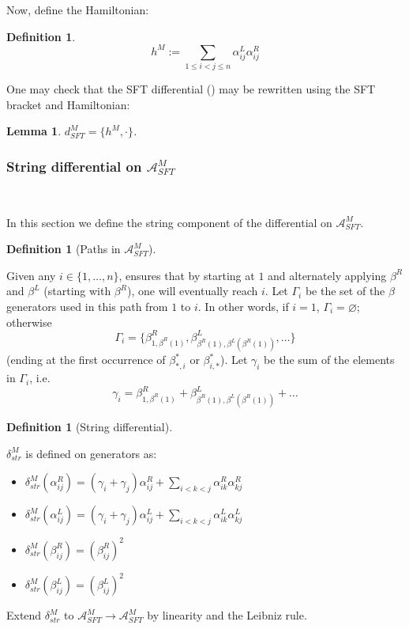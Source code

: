 \documentclass[a4paper,final, reqno]{amsart}
\theoremstyle{plain}
\newtheorem{Lemma}[Th]{Lemma}
\theoremstyle{definition}
\newtheorem{Def}[Th]{Definition}
\newcommand{\A}{\mathcal{A}}
\begin{document}
	Now, define the Hamiltonian:
	
	\begin{Def}
		\[ h^M := \sum_{1\leq i<j\leq n} \alpha_{ij}^L\alpha_{ij}^R \]
	\end{Def}
	
	One may check that the SFT differential () may be rewritten using the SFT bracket and Hamiltonian:
	
	
	\begin{Lemma}
		$d_{SFT}^M = \{h^M, \cdot\}$.
	\end{Lemma}
	
	
	\subsubsection{String differential  on $\A_{SFT}^M$}\-\
	
	In this section we define the string component of the differential on $\A^M_{SFT}$. 
	
	\begin{Def} [Paths in $\A^M_{SFT}$] \label{def:ampath}\-\
		
		Given any $i\in \{1,\dots, n\}$,  ensures that by starting at $1$ and alternately applying  $\beta^R$ and $\beta^L$  (starting with $\beta^R$), one will eventually reach $i$. Let $\Gamma_i$ be the set of the $\beta$ generators used in this path from $1$ to $i$. In other words, if $i=1$, $\Gamma_i = \varnothing$; otherwise
		\[ \Gamma_i = \{\beta_{1,\beta^R(1)}^R, \beta_{\beta^R(1), \beta^L(\beta^R(1))}^L , \dots \} \]
		(ending at the first occurrence of $\beta^*_{*, i}$ or $\beta^*_{i, *}$). Let $\gamma_i$ be the sum of the elements in $\Gamma_i$, i.e.
		\[ \gamma_i = \beta_{1,\beta^R(1)}^R + \beta_{\beta^R(1), \beta^L(\beta^R(1))}^L + \dots\]
		
	\end{Def}
	
	\begin{Def}[String differential]\label{def:amstrdiff} \-\
		
		$\delta_{str}^M$ is defined on generators as:
		
				
		\begin{itemize}
			\item $\delta_{str}^M(\alpha_{ij}^R) = (\gamma_i+\gamma_j)\alpha_{ij}^R + \sum_{i<k<j} \alpha_{ik}^R\alpha_{kj}^R$ %
			\item $\delta_{str}^M(\alpha_{ij}^L) = (\gamma_i+\gamma_j) \alpha_{ij}^L + \sum_{i<k<j} \alpha_{ik}^L \alpha_{kj}^L$
			\item $\delta_{str}^M(\beta_{ij}^R) = (\beta_{ij}^R)^2$ %
			\item $\delta_{str}^M(\beta_{ij}^L) = (\beta_{ij}^L)^2$ 
		\end{itemize}
		
		Extend $\delta_{str}^M$ to $\A^M_{SFT}\to \A^M_{SFT}$ by linearity and the Leibniz rule. 
		
	\end{Def}
	
\end{document}
